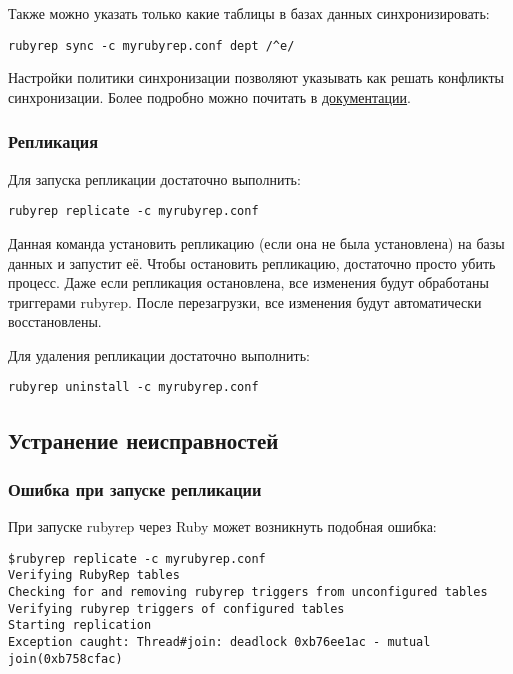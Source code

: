 Также можно указать только какие таблицы в базах данных синхронизировать:
\begin{lstlisting}[label=lst:rubyrep9,caption=Синхронизация баз данных]
rubyrep sync -c myrubyrep.conf dept /^e/
\end{lstlisting}

Настройки политики синхронизации позволяют указывать как решать конфликты синхронизации. 
Более подробно можно почитать в \href{http://www.rubyrep.org/configuration.html}{документации}. 

\subsubsection{Репликация}
Для запуска репликации достаточно выполнить:
\begin{lstlisting}[label=lst:rubyrep10,caption=Репликация]
rubyrep replicate -c myrubyrep.conf
\end{lstlisting}

Данная команда установить репликацию (если она не была установлена) на базы данных и запустит её.
Чтобы остановить репликацию, достаточно просто убить процесс. Даже если репликация остановлена, 
все изменения будут обработаны триггерами rubyrep. После перезагрузки, все изменения 
будут автоматически восстановлены.

Для удаления репликации достаточно выполнить:
\begin{lstlisting}[label=lst:rubyrep11,caption=Репликация]
rubyrep uninstall -c myrubyrep.conf
\end{lstlisting}

\subsection{Устранение неисправностей}
\subsubsection{Ошибка при запуске репликации}
При запуске rubyrep через Ruby может возникнуть подобная ошибка:
\begin{lstlisting}[label=lst:rubyrep12,caption=Устранение неисправностей]
$rubyrep replicate -c myrubyrep.conf 
Verifying RubyRep tables
Checking for and removing rubyrep triggers from unconfigured tables
Verifying rubyrep triggers of configured tables
Starting replication
Exception caught: Thread#join: deadlock 0xb76ee1ac - mutual join(0xb758cfac)
\end{lstlisting}

